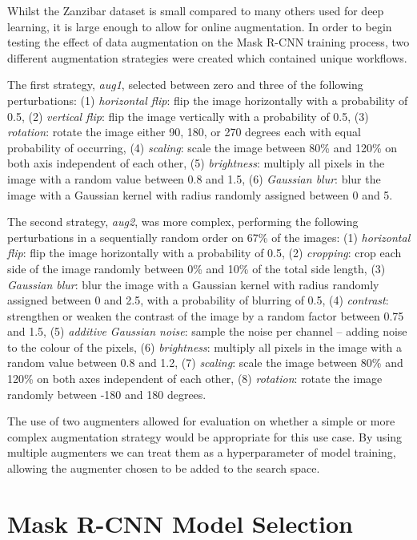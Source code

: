Whilst the Zanzibar dataset is small compared to many others used for deep learning, it is large enough to allow for online augmentation. In order to begin testing the effect of data augmentation on the Mask R-CNN training process, two different augmentation strategies were created which contained unique workflows. 

The first strategy, \textit{aug1}, selected between zero and three of the following perturbations: (1) \textit{horizontal flip}: flip the image horizontally with a probability of 0.5, (2) \textit{vertical flip}: flip the image vertically with a probability of 0.5, (3) \textit{rotation}: rotate the image either 90, 180, or 270 degrees each with equal probability of occurring, (4) \textit{scaling}: scale the image between 80\% and 120\% on both axis independent of each other, (5) \textit{brightness}: multiply all pixels in the image with a random value between 0.8 and 1.5, (6) \textit{Gaussian blur}: blur the image with a Gaussian kernel with radius randomly assigned between 0 and  5. 

The second strategy, \textit{aug2}, was more complex, performing the following perturbations in a sequentially random order on 67\% of the images: (1) \textit{horizontal flip}: flip the image horizontally with a probability of 0.5, (2) \textit{cropping}: crop each side of the image randomly between 0\% and 10\% of the total side length, (3) \textit{Gaussian blur}: blur the image with a Gaussian kernel with radius randomly assigned between 0 and 2.5, with a probability of blurring of 0.5, (4) \textit{contrast}: strengthen or weaken the contrast of the image by a random factor between 0.75 and 1.5, (5) \textit{additive Gaussian noise}: sample the noise per channel -- adding noise to the colour of the pixels, (6) \textit{brightness}: multiply all pixels in the image with a random value between 0.8 and 1.2, (7) \textit{scaling}: scale the image between 80\% and 120\% on both axes independent of each other, (8) \textit{rotation}: rotate the image randomly between -180 and 180 degrees. 

The use of two augmenters allowed for evaluation on whether a simple or more complex augmentation strategy would be appropriate for this use case. By using multiple augmenters we can treat them as a hyperparameter of model training, allowing the augmenter chosen to be added to the search space.

\section{Mask R-CNN Model Selection}\label{ch:cetDet,sec:ModelSelection}

